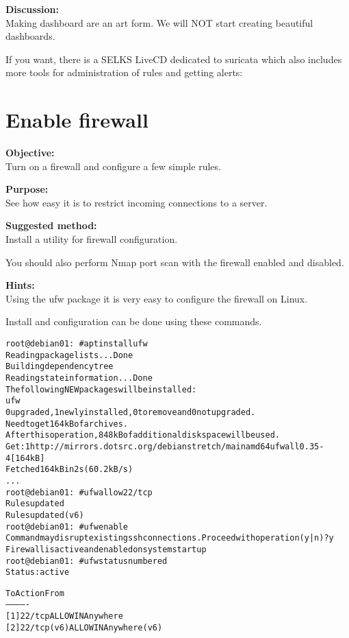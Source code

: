 \documentclass[a4paper,11pt,notitlepage]{report}
\begin{document}
{\bf Discussion:}\\
Making dashboard are an art form. We will NOT start creating beautiful dashboards.

If you want, there is a SELKS LiveCD dedicated to suricata which also includes more tools for administration of rules and getting alerts:\\



\chapter{Enable firewall}
\label{ex:debian-firewall}

{\bf Objective:}\\
Turn on a firewall and configure a few simple rules.

{\bf Purpose:}\\
See how easy it is to restrict incoming connections to a server.


{\bf Suggested method:}\\
Install a utility for firewall configuration.

You should also perform Nmap port scan with the firewall enabled and disabled.

{\bf Hints:}\\
Using the ufw package it is very easy to configure the firewall on Linux.

Install and configuration can be done using these commands.
\begin{alltt}
root@debian01:~# apt install ufw
Reading package lists... Done
Building dependency tree
Reading state information... Done
The following NEW packages will be installed:
  ufw
0 upgraded, 1 newly installed, 0 to remove and 0 not upgraded.
Need to get 164 kB of archives.
After this operation, 848 kB of additional disk space will be used.
Get:1 http://mirrors.dotsrc.org/debian stretch/main amd64 ufw all 0.35-4 [164 kB]
Fetched 164 kB in 2s (60.2 kB/s)
...
root@debian01:~# ufw allow 22/tcp
Rules updated
Rules updated (v6)
root@debian01:~# ufw enable
Command may disrupt existing ssh connections. Proceed with operation (y|n)? y
Firewall is active and enabled on system startup
root@debian01:~# ufw status numbered
Status: active

     To                         Action      From
     --                         ------      ----
[ 1] 22/tcp                     ALLOW IN    Anywhere
[ 2] 22/tcp (v6)                ALLOW IN    Anywhere (v6)
\end{alltt}
\end{document}
